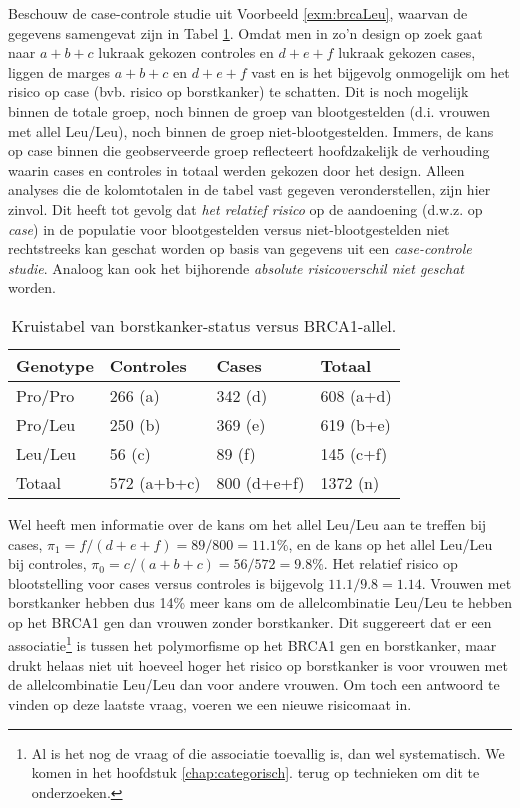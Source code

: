 \documentclass[
  12pt,dutch,coursenotes]{book}
\theoremstyle{definition}
\theoremstyle{definition}
\theoremstyle{definition}
\theoremstyle{remark}
\begin{document}
Beschouw de case-controle studie uit Voorbeeld \ref{exm:brcaLeu}, waarvan
de gegevens samengevat zijn in Tabel \ref{tab:leu2}. Omdat men in
zo'n design op zoek gaat naar \(a+b+c\) lukraak gekozen controles en \(d+e+f\) lukraak
gekozen cases, liggen de marges \(a+b+c\) en \(d+e+f\) vast en is het bijgevolg
onmogelijk om het risico op case (bvb. risico op borstkanker) te schatten. Dit is noch mogelijk binnen de
totale groep, noch binnen de groep van blootgestelden (d.i. vrouwen met allel Leu/Leu), noch binnen de groep
niet-blootgestelden. Immers, de kans op case binnen die geobserveerde groep reflecteert hoofdzakelijk de verhouding waarin cases en controles in totaal werden gekozen door het design. Alleen analyses die de kolomtotalen
in de tabel vast gegeven veronderstellen, zijn hier zinvol. Dit heeft tot
gevolg dat \emph{het relatief risico} op de aandoening (d.w.z. op \emph{case})
in de populatie voor blootgestelden versus niet-blootgestelden niet
rechtstreeks kan geschat worden op basis van gegevens uit een \emph{case-controle studie}. Analoog kan ook het bijhorende \emph{absolute risicoverschil niet geschat} worden.

\begin{table}[t]

\caption{\label{tab:leu2}Kruistabel van borstkanker-status versus BRCA1-allel.}
\centering
\begin{tabular}{llll}
\toprule
Genotype & Controles & Cases & Totaal\\
\midrule
Pro/Pro & 266 (a) & 342 (d) & 608 (a+d)\\
Pro/Leu & 250 (b) & 369 (e) & 619 (b+e)\\
Leu/Leu & 56 (c) & 89 (f) & 145 (c+f)\\
Totaal & 572 (a+b+c) & 800 (d+e+f) & 1372 (n)\\
\bottomrule
\end{tabular}
\end{table}

Wel heeft men informatie over de kans om het allel Leu/Leu aan te treffen bij cases, \(\pi_1=f/(d+e+f)=89/800=11.1\%\), en de kans op het allel Leu/Leu bij controles, \(\pi_0=c/(a+b+c)=56/572=9.8\%\). Het relatief risico op blootstelling voor cases versus
controles is bijgevolg \(11.1/9.8=1.14\). Vrouwen met borstkanker hebben dus
14\% meer kans om de allelcombinatie Leu/Leu te hebben op het BRCA1 gen dan vrouwen zonder borstkanker.
Dit suggereert dat er
een associatie\footnote{Al is het nog de vraag of die associatie toevallig is, dan wel systematisch. We komen in het hoofdstuk \ref{chap:categorisch}. terug op technieken om dit te onderzoeken.} is tussen het polymorfisme op het BRCA1 gen en borstkanker, maar drukt helaas niet uit hoeveel hoger het risico op borstkanker is voor vrouwen met de allelcombinatie Leu/Leu dan voor andere vrouwen. Om toch een antwoord te vinden op deze laatste vraag, voeren we een nieuwe risicomaat in.
\end{document}
